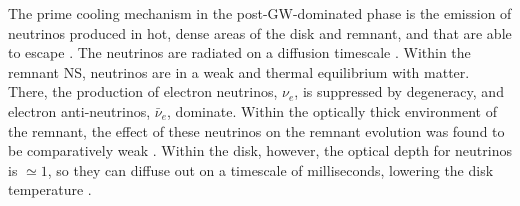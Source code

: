 The prime cooling mechanism in the post-\ac{GW}-dominated phase is the emission of 
neutrinos produced in hot, dense areas of the disk and remnant, and that are 
able to escape \citep{Eichler:1989ve,Rosswog:2003rv,Sekiguchi:2011zd}. 
The neutrinos are radiated on a diffusion timescale \citep{Perego:2014fma}.
%
%
Within the remnant \ac{NS}, neutrinos are in a weak and thermal equilibrium with matter. 
There, the production of electron neutrinos, $\nu_e$,
is suppressed by degeneracy, and 
electron anti-neutrinos, $\bar{\nu}_{e}$, dominate. 
Within the optically thick environment of the remnant, the effect of these neutrinos 
on the remnant evolution was found to be comparatively weak 
\citep{Foucart:2015gaa,Perego:2019adq}.
%
Within the disk, however, the optical depth for neutrinos is ${\simeq}1$, so 
they can diffuse out on a timescale of milliseconds, lowering the disk 
temperature 
\citep{Beloborodov:2008nx}.



